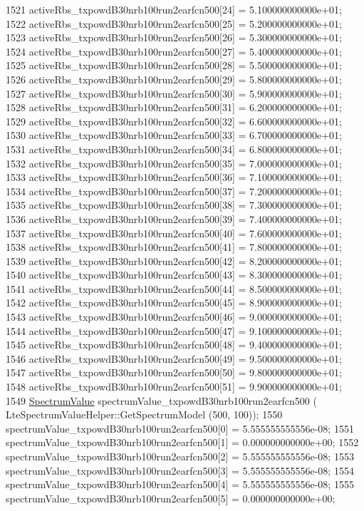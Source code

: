 \begin{DoxyCode}
1521   activeRbs\_txpowdB30nrb100run2earfcn500[24] = 5.100000000000e+01;
1522   activeRbs\_txpowdB30nrb100run2earfcn500[25] = 5.200000000000e+01;
1523   activeRbs\_txpowdB30nrb100run2earfcn500[26] = 5.300000000000e+01;
1524   activeRbs\_txpowdB30nrb100run2earfcn500[27] = 5.400000000000e+01;
1525   activeRbs\_txpowdB30nrb100run2earfcn500[28] = 5.500000000000e+01;
1526   activeRbs\_txpowdB30nrb100run2earfcn500[29] = 5.800000000000e+01;
1527   activeRbs\_txpowdB30nrb100run2earfcn500[30] = 5.900000000000e+01;
1528   activeRbs\_txpowdB30nrb100run2earfcn500[31] = 6.200000000000e+01;
1529   activeRbs\_txpowdB30nrb100run2earfcn500[32] = 6.600000000000e+01;
1530   activeRbs\_txpowdB30nrb100run2earfcn500[33] = 6.700000000000e+01;
1531   activeRbs\_txpowdB30nrb100run2earfcn500[34] = 6.800000000000e+01;
1532   activeRbs\_txpowdB30nrb100run2earfcn500[35] = 7.000000000000e+01;
1533   activeRbs\_txpowdB30nrb100run2earfcn500[36] = 7.100000000000e+01;
1534   activeRbs\_txpowdB30nrb100run2earfcn500[37] = 7.200000000000e+01;
1535   activeRbs\_txpowdB30nrb100run2earfcn500[38] = 7.300000000000e+01;
1536   activeRbs\_txpowdB30nrb100run2earfcn500[39] = 7.400000000000e+01;
1537   activeRbs\_txpowdB30nrb100run2earfcn500[40] = 7.600000000000e+01;
1538   activeRbs\_txpowdB30nrb100run2earfcn500[41] = 7.800000000000e+01;
1539   activeRbs\_txpowdB30nrb100run2earfcn500[42] = 8.200000000000e+01;
1540   activeRbs\_txpowdB30nrb100run2earfcn500[43] = 8.300000000000e+01;
1541   activeRbs\_txpowdB30nrb100run2earfcn500[44] = 8.500000000000e+01;
1542   activeRbs\_txpowdB30nrb100run2earfcn500[45] = 8.900000000000e+01;
1543   activeRbs\_txpowdB30nrb100run2earfcn500[46] = 9.000000000000e+01;
1544   activeRbs\_txpowdB30nrb100run2earfcn500[47] = 9.100000000000e+01;
1545   activeRbs\_txpowdB30nrb100run2earfcn500[48] = 9.400000000000e+01;
1546   activeRbs\_txpowdB30nrb100run2earfcn500[49] = 9.500000000000e+01;
1547   activeRbs\_txpowdB30nrb100run2earfcn500[50] = 9.800000000000e+01;
1548   activeRbs\_txpowdB30nrb100run2earfcn500[51] = 9.900000000000e+01;
1549   \hyperlink{classns3_1_1SpectrumValue}{SpectrumValue} spectrumValue\_txpowdB30nrb100run2earfcn500 (
      LteSpectrumValueHelper::GetSpectrumModel (500, 100));
1550   spectrumValue\_txpowdB30nrb100run2earfcn500[0] = 5.555555555556e-08;
1551   spectrumValue\_txpowdB30nrb100run2earfcn500[1] = 0.000000000000e+00;
1552   spectrumValue\_txpowdB30nrb100run2earfcn500[2] = 5.555555555556e-08;
1553   spectrumValue\_txpowdB30nrb100run2earfcn500[3] = 5.555555555556e-08;
1554   spectrumValue\_txpowdB30nrb100run2earfcn500[4] = 5.555555555556e-08;
1555   spectrumValue\_txpowdB30nrb100run2earfcn500[5] = 0.000000000000e+00;

\end{DoxyCode}
